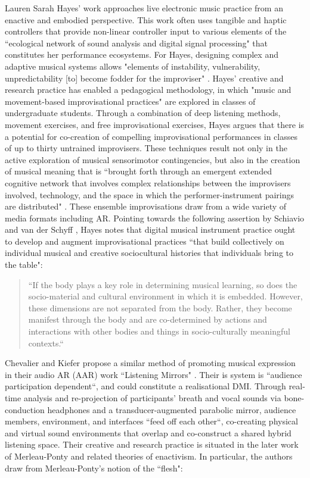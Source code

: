 Lauren Sarah Hayes' work approaches live electronic music practice from an enactive and embodied perspective. This work often uses tangible and haptic controllers that provide non-linear controller input to various elements of the ``ecological network of sound analysis and digital signal processing" that constitutes her performance ecosystems. For Hayes, designing complex and adaptive musical systems allows "elements of instability, vulnerability, unpredictability [to] become fodder for the improviser" \citep[p. 2]{hayes2018}. Hayes' creative and research practice has enabled a pedagogical methodology, in which "music and movement-based improvisational practices" are explored in classes of undergraduate students. Through a combination of deep listening methods, movement exercises, and free improvisational exercises, Hayes argues that there is a potential for co-creation of compelling improvisational performances in classes of up to thirty untrained improvisers. These techniques result not only in the active exploration of musical sensorimotor contingencies, but also in the creation of musical meaning that is ``brought forth through an emergent extended cognitive network that involves complex relationships between the improvisers involved, technology, and the space in which the performer-instrument pairings are distributed" \citep[p. 8]{hayes2019}. These ensemble improvisations draw from a wide variety of media formats including AR. Pointing towards the following assertion by Schiavio and van der Schyff \citeyearpar{schiavio2018}, Hayes notes that digital musical instrument practice ought to develop and augment improvisational practices ``that build collectively on individual musical and creative sociocultural histories that individuals bring to the table":
\begin{quote}
    ``If the body plays a key role in determining musical learning, so does the socio-material and cultural environment in which it is embedded. However, these dimensions are not separated from the body. Rather, they become manifest through the body and are co-determined by actions and interactions with other bodies and things in socio-culturally meaningful contexts.`` \citep[p. 9]{hayes2018}
\end{quote}
Chevalier and Kiefer propose a similar method of promoting musical expression in their audio AR (AAR) work ``Listening Mirrors" \citeyearpar[]{chevalier2018}. Their is system is ``audience participation dependent``, and could constitute a realisational DMI. Through real-time analysis and re-projection of participants' breath and vocal sounds via bone-conduction headphones and a transducer-augmented parabolic mirror, audience members, environment, and interfaces ``feed off each other``, co-creating physical and virtual sound environments that overlap and co-construct a shared hybrid listening space. Their creative and research practice is situated in the later work of Merleau-Ponty and related theories of enactivism. In particular, the authors draw from Merleau-Ponty's notion of the ``flesh":
